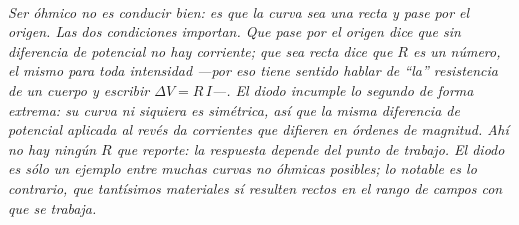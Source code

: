 \begin{center}
\begin{tikzpicture}
\end{tikzpicture}\\[0.5em]
{\small\itshape Ser óhmico no es conducir bien: es que la curva sea una recta
\emph{y} pase por el origen. Las dos condiciones importan. Que pase por el
origen dice que sin diferencia de potencial no hay corriente; que sea recta
dice que $R$ es un número, el mismo para toda intensidad ---por eso tiene
sentido hablar de \enquote{la} resistencia de un cuerpo y escribir
$\Delta V = R\,I$---. El diodo incumple lo segundo de forma extrema: su curva
ni siquiera es simétrica, así que la misma diferencia de potencial aplicada al
revés da corrientes que difieren en órdenes de magnitud. Ahí no hay ningún $R$
que reporte: la respuesta depende del punto de trabajo. El diodo es sólo un
ejemplo entre muchas curvas no óhmicas posibles; lo notable es lo contrario,
que tantísimos materiales sí resulten rectos en el rango de campos con que se
trabaja.}
\end{center}
